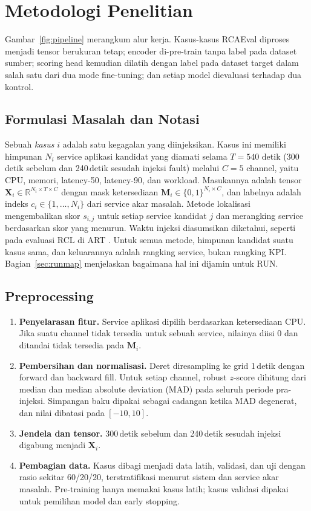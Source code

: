 \section{Metodologi Penelitian}\label{sec:method}
Gambar~\ref{fig:pipeline} merangkum alur kerja. Kasus-kasus RCAEval diproses menjadi tensor berukuran tetap; encoder di-pre-train tanpa label pada dataset sumber; scoring head kemudian dilatih dengan label pada dataset target dalam salah satu dari dua mode fine-tuning; dan setiap model dievaluasi terhadap dua kontrol.


\subsection{Formulasi Masalah dan Notasi}
Sebuah \emph{kasus} $i$ adalah satu kegagalan yang diinjeksikan. Kasus ini memiliki himpunan $N_i$ service aplikasi kandidat yang diamati selama $T=540$ detik (300\,detik sebelum dan 240\,detik sesudah injeksi fault) melalui $C=5$ channel, yaitu CPU, memori, latency-50, latency-90, dan workload. Masukannya adalah tensor $\mathbf{X}_i\in\mathbb{R}^{N_i\times T\times C}$ dengan mask ketersediaan $\mathbf{M}_i\in\{0,1\}^{N_i\times C}$, dan labelnya adalah indeks $c_i\in\{1,\dots,N_i\}$ dari service akar masalah. Metode lokalisasi mengembalikan skor $s_{i,j}$ untuk setiap service kandidat $j$ dan merangking service berdasarkan skor yang menurun. Waktu injeksi diasumsikan diketahui, seperti pada evaluasi RCL di ART \cite{sun2024art}. Untuk semua metode, himpunan kandidat suatu kasus sama, dan keluarannya adalah rangking service, bukan rangking KPI. Bagian~\ref{sec:runmap} menjelaskan bagaimana hal ini dijamin untuk RUN.

\subsection{Preprocessing}
\begin{enumerate}
\item \textbf{Penyelarasan fitur.} Service aplikasi dipilih berdasarkan ketersediaan CPU. Jika suatu channel tidak tersedia untuk sebuah service, nilainya diisi 0 dan ditandai tidak tersedia pada $\mathbf{M}_i$.
\item \textbf{Pembersihan dan normalisasi.} Deret diresampling ke grid 1\,detik dengan forward dan backward fill. Untuk setiap channel, robust $z$-score dihitung dari median dan median absolute deviation (MAD) pada seluruh periode pra-injeksi. Simpangan baku dipakai sebagai cadangan ketika MAD degenerat, dan nilai dibatasi pada $[-10,10]$.
\item \textbf{Jendela dan tensor.} 300\,detik sebelum dan 240\,detik sesudah injeksi digabung menjadi $\mathbf{X}_i$.
\item \textbf{Pembagian data.} Kasus dibagi menjadi data latih, validasi, dan uji dengan rasio sekitar 60/20/20, terstratifikasi menurut sistem dan service akar masalah. Pre-training hanya memakai kasus latih; kasus validasi dipakai untuk pemilihan model dan early stopping.
\end{enumerate}


